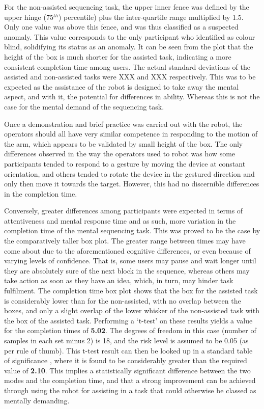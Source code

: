 \documentclass[11pt]{article}
\begin{document}
For the non-assisted sequencing task, the upper inner fence was defined by the upper hinge (75$^{th}$) percentile) plus the inter-quartile range multiplied by 1.5. Only one value was above this fence, and was thus classified as a suspected anomaly. This value corresponds to the only participant who identified as colour blind, solidifying its status as an anomaly. It can be seen from the plot that the height of the box is much shorter for the assisted task, indicating a more consistent completion time among users. The actual standard deviations of the assisted and non-assisted tasks were XXX and XXX respectively. This was to be expected as the assistance of the robot is designed to take away the mental aspect, and with it, the potential for differences in ability. Whereas this is not the case for the mental demand of the sequencing task. 

Once a demonstration and brief practice was carried out with the robot, the operators should all have very similar competence in responding to the motion of the arm, which appears to be validated by small height of the box. The only differences observed in the way the operators used to robot was how some participants tended to respond to a gesture by moving the device at constant orientation, and others tended to rotate the device in the gestured direction and only then move it towards the target. However, this had no discernible differences in the completion time. 

Conversely, greater differences among participants were expected in terms of attentiveness and mental response time and as such, more variation in the completion time of the mental sequencing task. This was proved to be the case by the comparatively taller box plot. The greater range between times may have come about due to the aforementioned cognitive differences, or even because of varying levels of confidence. That is, some users may pause and wait longer until they are absolutely sure of the next block in the sequence, whereas others may take action as soon as they have an idea, which, in turn, may hinder task fulfilment. The completion time box plot shows that the box for the assisted task is considerably lower than for the non-assisted, with no overlap between the boxes, and only a slight overlap of the lower whisker of the non-assisted task with the box of the assisted task. Performing a `t-test' on these results yields a value for the completion times of \textbf{5.02}. The degrees of freedom in this case (number of samples in each set minus 2) is 18, and the risk level is assumed to be 0.05 (as per rule of thumb). This t-test result can then be looked up in a standard table of significance \cite{ttable}, where it is found to be considerably greater than the required value of \textbf{2.10}. This implies a statistically significant difference between the two modes and the completion time, and that a strong improvement can be achieved through using the robot for assisting in a task that could otherwise be classed as mentally demanding. 
\end{document}
